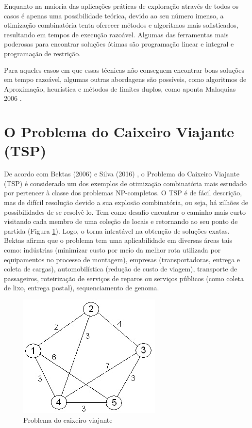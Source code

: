 Enquanto na maioria das aplicações práticas de exploração através de todos os casos é apenas uma possibilidade teórica, devido ao seu número imenso, a otimização combinatória tenta oferecer métodos e algoritmos mais sofisticados, resultando em tempos de execução razoável. Algumas das ferramentas mais poderosas para encontrar soluções ótimas são programação linear e integral e programação de restrição.

Para aqueles casos em que essas técnicas não conseguem encontrar boas soluções em tempo razoável, algumas outras abordagens são possíveis, como algoritmos de Aproximação, heurística e métodos de limites duplos, como aponta Malaquias 2006 \cite{malaquias2006uso}.

\section{O Problema do Caixeiro Viajante (TSP)}
\label{sec-tsp}

De acordo com Bektas (2006) \cite{bektas2006multiple} e Silva (2016) \cite{silva2016algoritmo}, o Problema do Caixeiro Viajante (TSP) é considerado um dos exemplos de otimização combinatória mais estudado por pertencer à classe dos problemas NP-completos. O TSP é de fácil descrição, mas de difícil resolução devido a sua explosão combinatória, ou seja, há zilhões de possibilidades de se resolvê-lo. Tem como desafio encontrar o caminho mais curto visitando cada membro de uma coleção de locais e retornando ao seu ponto de partida (Figura \ref{fig:tsp-sample}). Logo, o torna intratável na obtenção de soluções exatas. Bektas afirma que o problema tem uma aplicabilidade em diversas áreas tais como: indústrias (minimizar custo por meio da melhor rota utilizada por equipamentos no processo de montagem), empresas (transportadoras, entrega e coleta de cargas), automobilística (redução de custo de viagem), transporte de passageiros, roteirização de serviços de reparos ou serviços públicos (como coleta de lixo, entrega postal), sequenciamento de genoma.

\begin{figure}[h]
	\caption{\label{fig:tsp-sample}Problema do caixeiro-viajante}
	\begin{center}
	    \includegraphics[scale=0.5]{imagens/tsp-sample.jpg}
	\end{center}
\end{figure}


